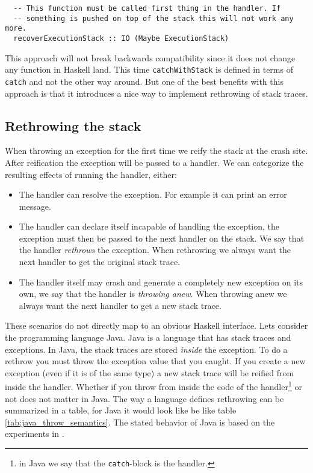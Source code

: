 \begin{verbatim}
  -- This function must be called first thing in the handler. If
  -- something is pushed on top of the stack this will not work any more.
  recoverExecutionStack :: IO (Maybe ExecutionStack)
\end{verbatim}

This approach will not break backwards compatibility since it does not
change any function in Haskell land. This time \texttt{catchWithStack}
is defined in terms of \texttt{catch} and not the other way around.
But one of the best benefits with this approach is that it introduces a
nice way to implement rethrowing of stack traces.



\subsection{Rethrowing the stack} \label{sec:rethrowing_the_stack}

When throwing an exception for the first time we reify the stack
at the crash site. After reification the exception will be passed to a handler.
We can categorize the resulting effects of running the handler, either:

\begin{itemize}
  \item
    The handler can resolve the exception. For example it can print an
    error message.

  \item
    The handler can declare itself incapable of handling the exception,
    the exception must then be passed to the next handler on the stack.
    We say that the handler \emph{rethrows} the exception. When
    rethrowing we always want the next handler to get the original stack
    trace.

  \item
    The handler itself may crash and generate a completely new exception
    on its own, we say that the handler is \emph{throwing anew}. When
    throwing anew we always want the next handler to get a new stack
    trace.

\end{itemize}

These scenarios do not directly map to an obvious Haskell
interface. Lets consider the programming language Java. Java is a
language that has stack traces and exceptions. In Java, the stack traces
are stored \emph{inside} the exception. To do a rethrow you must throw
the exception value that you caught. If you create a new exception (even
if it is of the same type) a new stack trace will be reified from inside
the handler. Whether if you throw from inside the code of the
handler\footnote{in Java we say that the \texttt{catch}-block is the handler.}
or not does not matter in Java. The way a language defines rethrowing can be summarized
in a table, for Java it would look like be like table \ref{tab:java_throw_semantics}. The
stated behavior of Java is based on the experiments in \cite{github_gist_in_out_java}.

